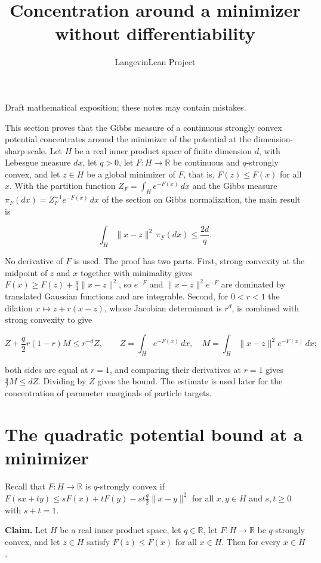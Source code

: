 \documentclass[11pt,a4paper]{article}
\title{\texorpdfstring{Concentration around a minimizer without differentiability}{Concentration around a minimizer without differentiability}}
\author{LangevinLean Project}
\date{}
\begin{document}
\maketitle
Draft mathematical exposition; these notes may contain mistakes.


This section proves that the Gibbs measure of a continuous strongly convex potential concentrates around the minimizer of the potential at the dimension-sharp scale. Let \(H\) be a real inner product space of finite dimension \(d\), with Lebesgue measure \(dx\), let \(q>0\), let \(F:H\to\mathbb R\) be continuous and \(q\)-strongly convex, and let \(z\in H\) be a global minimizer of \(F\), that is, \(F(z)\le F(x)\) for all \(x\). With the partition function \(Z_F=\int_He^{-F(x)}\,dx\) and the Gibbs measure \(\pi_F(dx)=Z_F^{-1}e^{-F(x)}\,dx\) of the section on Gibbs normalization, the main result is


\[\int_H\|x-z\|^2\,\pi_F(dx)\le\frac{2d}{q}.\]


No derivative of \(F\) is used. The proof has two parts. First, strong convexity at the midpoint of \(z\) and \(x\) together with minimality gives \(F(x)\ge F(z)+\frac q4\|x-z\|^2\), so \(e^{-F}\) and \(\|x-z\|^2e^{-F}\) are dominated by translated Gaussian functions and are integrable. Second, for \(0<r<1\) the dilation \(x\mapsto z+r(x-z)\), whose Jacobian determinant is \(r^d\), is combined with strong convexity to give


\[Z+\frac q2r(1-r)M\le r^{-d}Z,\qquad Z=\int_He^{-F(x)}\,dx,\quad M=\int_H\|x-z\|^2e^{-F(x)}\,dx;\]


both sides are equal at \(r=1\), and comparing their derivatives at \(r=1\) gives \(\frac q2M\le dZ\). Dividing by \(Z\) gives the bound. The estimate is used later for the concentration of parameter marginals of particle targets.


\section{\texorpdfstring{The quadratic potential bound at a minimizer}{The quadratic potential bound at a minimizer}}


Recall that \(F:H\to\mathbb R\) is \(q\)-strongly convex if \(F(sx+ty)\le sF(x)+tF(y)-st\frac q2\|x-y\|^2\) for all \(x,y\in H\) and \(s,t\ge0\) with \(s+t=1\).




\textbf{Claim.} Let \(H\) be a real inner product space, let \(q\in\mathbb R\), let \(F:H\to\mathbb R\) be \(q\)-strongly convex, and let \(z\in H\) satisfy \(F(z)\le F(x)\) for all \(x\in H\). Then for every \(x\in H\),
\end{document}
